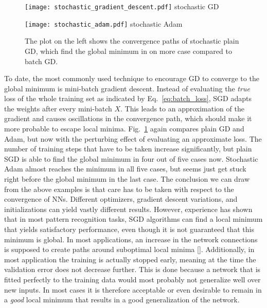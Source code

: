 \begin{figure}
  \begin{minipage}[b]{.49\textwidth}
    \centering
    \texttt{[image: stochastic\_gradient\_descent.pdf]}
    stochastic GD
  \end{minipage}
  \hspace{.02\textwidth}
  \begin{minipage}[b]{.49\textwidth}
    \centering
    \texttt{[image: stochastic\_adam.pdf]}
    stochastic Adam
  \end{minipage}
  \caption{The plot on the left shows the convergence paths of stochastic plain
    GD, which find the global minimum in on more case compared to batch GD.}
  \label{fig:error_surface_sgd}
\end{figure}
To date, the most commonly used technique to encourage GD to converge to the
global minimum is mini-batch gradient descent.  Instead of evaluating the
\emph{true} loss of the whole training set as indicated by
Eq.~\ref{eq:batch_loss}, SGD adapts the weights after every mini-batch $X$.
This leads to an approximation of the gradient and causes oscillations in the
convergence path, which should make it more probable to escape local minima.
Fig.~\ref{fig:error_surface_sgd} again compares plain GD and Adam, but now with
the perturbing effect of evaluating an approximate loss. The number of training
steps that have to be taken increase significantly, but plain SGD is able to
find the global minimum in four out of five cases now. Stochastic Adam almost
reaches the minimum in all five cases, but seems just get stuck right before
the global minimum in the last case.  The conclusion we can draw from the above
examples is that care has to be taken with respect to the convergence of NNs.
Different optimizers, gradient descent variations, and initializations can
yield vastly different results. However, experience has shown that in most
pattern recognition tasks, SGD algorithms can find a local minimum that yields
satisfactory performance, even though it is not guaranteed that this minimum is
global.  In most applications, an increase in the network connections is
supposed to create paths around suboptimal local minima [\cite{rumelhart1986}].
Additionally, in most application the training is actually stopped early,
meaning at the time the validation error does not decrease further.  This is
done because a network that is fitted perfectly to the training data would most
probably not generalize well over new inputs.  In most cases it is therefore
acceptable or even desirable to remain in a \emph{good} local minimum that
results in a good generalization of the network.


